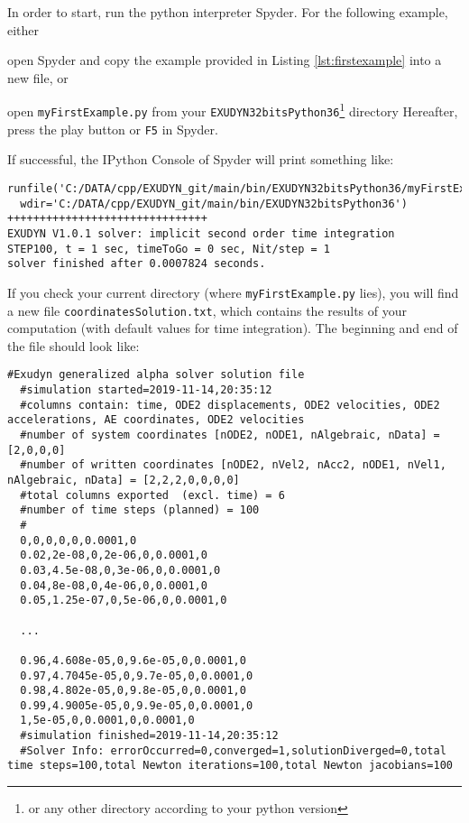 In order to start, run the python interpreter Spyder.
For the following example, either 
\bi
	\item open Spyder and copy the example provided in Listing \ref{lst:firstexample} into a new file, or
	\item open \texttt{myFirstExample.py} from your \texttt{EXUDYN32bitsPython36}\footnote{or any other directory according to your python version} directory
\ei
Hereafter, press the play button or \texttt{F5} in Spyder.
%

If successful, the IPython Console of Spyder will print something like:
\plainlststyle
{\ttfamily \footnotesize
\begin{lstlisting}
runfile('C:/DATA/cpp/EXUDYN_git/main/bin/EXUDYN32bitsPython36/myFirstExample.py', 
  wdir='C:/DATA/cpp/EXUDYN_git/main/bin/EXUDYN32bitsPython36')
+++++++++++++++++++++++++++++++
EXUDYN V1.0.1 solver: implicit second order time integration
STEP100, t = 1 sec, timeToGo = 0 sec, Nit/step = 1
solver finished after 0.0007824 seconds.
\end{lstlisting}
}

If you check your current directory (where \texttt{myFirstExample.py} lies), you will find a new file \texttt{coordinatesSolution.txt}, which contains the results of your computation (with default values for time integration).
The beginning and end of the file should look like: \vspace{6pt}\\
{\ttfamily \footnotesize
\begin{lstlisting}[breaklines=true]
  #Exudyn generalized alpha solver solution file
  #simulation started=2019-11-14,20:35:12
  #columns contain: time, ODE2 displacements, ODE2 velocities, ODE2 accelerations, AE coordinates, ODE2 velocities
  #number of system coordinates [nODE2, nODE1, nAlgebraic, nData] = [2,0,0,0]
  #number of written coordinates [nODE2, nVel2, nAcc2, nODE1, nVel1, nAlgebraic, nData] = [2,2,2,0,0,0,0]
  #total columns exported  (excl. time) = 6
  #number of time steps (planned) = 100
  #
  0,0,0,0,0,0.0001,0
  0.02,2e-08,0,2e-06,0,0.0001,0
  0.03,4.5e-08,0,3e-06,0,0.0001,0
  0.04,8e-08,0,4e-06,0,0.0001,0
  0.05,1.25e-07,0,5e-06,0,0.0001,0

  ...

  0.96,4.608e-05,0,9.6e-05,0,0.0001,0
  0.97,4.7045e-05,0,9.7e-05,0,0.0001,0
  0.98,4.802e-05,0,9.8e-05,0,0.0001,0
  0.99,4.9005e-05,0,9.9e-05,0,0.0001,0
  1,5e-05,0,0.0001,0,0.0001,0
  #simulation finished=2019-11-14,20:35:12
  #Solver Info: errorOccurred=0,converged=1,solutionDiverged=0,total time steps=100,total Newton iterations=100,total Newton jacobians=100
\end{lstlisting}
}


